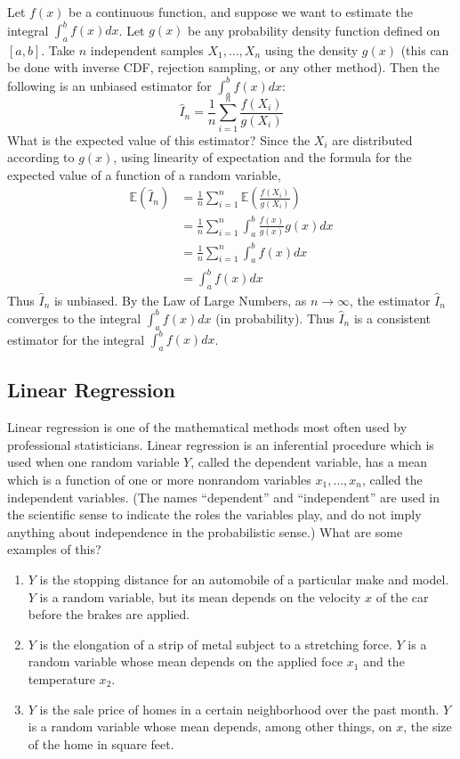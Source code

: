 \documentclass[12pt]{article}
\theoremstyle{definition}
\theoremstyle{remark}
\def\E{{\mathbb E}}
\begin{document}
Let $f(x)$ be a continuous function, and suppose we want to estimate the integral $\int_a^b f(x) dx$. Let $g(x)$ be any probability density function defined on $[a, b]$. Take $n$ independent samples $X_1, \dots, X_n$ using the density $g(x)$ (this can be done with inverse CDF, rejection sampling, or any other method). Then the following is an unbiased estimator for $\int_a^b f(x) dx$:
\[
\hat{I}_n = \frac{1}{n}\sum_{i=1}^n \frac{ f(X_i) }{g(X_i) }
\]
What is the expected value of this estimator? Since the $X_i$ are distributed according to $g(x)$, using linearity of expectation and the formula for the expected value of a function of a random variable,
\begin{align*}
\E( \hat{I}_n ) &= \frac{1}{n} \sum_{i=1}^n \E \left( \frac{ f(X_i) }{g(X_i) }\right) \\
&= \frac{1}{n}\sum_{i=1}^n \int_a^b \frac{ f(x) }{g(x) } g(x) dx \\
&= \frac{1}{n}\sum_{i=1}^n \int_a^b f(x) dx \\
&= \int_a^b f(x) dx
\end{align*}
Thus $\hat{I}_n$ is unbiased. By the Law of Large Numbers, as $n \rightarrow \infty$, the estimator $\hat{I}_n$ converges to the integral $\int_a^b f(x) dx$ (in probability). Thus $\hat{I}_n$ is a consistent estimator for the integral $\int_a^b f(x) dx$.

\subsection{Linear Regression}

Linear regression is one of the mathematical methods most often used by professional statisticians. Linear regression is an inferential procedure which is used when one random variable $Y$, called the dependent variable, has a mean which is a function of one or more nonrandom variables $x_1, \dots, x_n$, called the independent variables. (The names ``dependent'' and ``independent'' are used in the scientific sense to indicate the roles the variables play, and do not imply anything about independence in the probabilistic sense.) What are some examples of this? 
\begin{enumerate}
\item $Y$ is the stopping distance for an automobile of a particular make and model. $Y$ is a random variable, but its mean depends on the velocity $x$ of the car before the brakes are applied.
\item $Y$ is the elongation of a strip of metal subject to a stretching force. $Y$ is a random variable whose mean depends on the applied foce $x_1$ and the temperature $x_2$.
\item $Y$ is the sale price of homes in a certain neighborhood over the past month. $Y$ is a random variable whose mean depends, among other things, on $x$, the size of the home in square feet. 
\end{enumerate}
\end{document}
